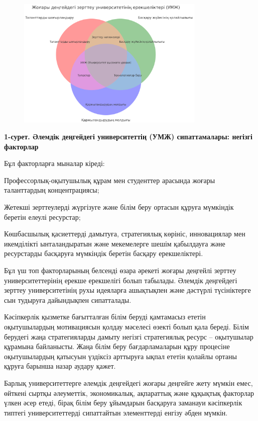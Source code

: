 \begin{figure}[H]
	\centering
	\includegraphics[width=0.8\textwidth]{media/ekon/image4}
	\caption*{}
\end{figure}


{\bfseries 1-сурет. Әлемдік деңгейдегі университеттің (УМЖ) сипаттамалары:
негізгі факторлар}

Бұл факторларға мыналар кіреді:

Профессорлық-оқытушылық құрам мен студенттер арасында жоғары
таланттардың концентрациясы;

Жетекші зерттеулерді жүргізуге және білім беру ортасын құруға мүмкіндік
беретін елеулі ресурстар;

Көшбасшылық қасиеттерді дамытуға, стратегиялық көрініс, инновациялар мен
икемділікті ынталандыратын және мекемелерге шешім қабылдауға және
ресурстарды басқаруға мүмкіндік беретін басқару ерекшеліктері.

Бұл үш топ факторларының белсенді өзара әрекеті жоғары деңгейлі зерттеу
университеттерінің ерекше ерекшелігі болып табылады. Әлемдік деңгейдегі
зерттеу университетінің рухы идеяларға ашықтықпен және дәстүрлі
түсініктерге сын тудыруға дайындықпен сипатталады.

Кәсіпкерлік қызметке бағытталған білім беруді қамтамасыз ететін
оқытушылардың мотивациясын қолдау мәселесі өзекті болып қала береді.
Білім берудегі жаңа стратегияларды дамыту негізгі стратегиялық ресурс --
оқытушылар құрамына байланысты. Жаңа білім беру бағдарламаларын құру
процесіне оқытушылардың қатысуын үздіксіз арттыруға ықпал ететін қолайлы
ортаны құруға барынша назар аудару қажет.

Барлық университеттерге әлемдік деңгейдегі жоғары деңгейге жету мүмкін
емес, өйткені сыртқы әлеуметтік, экономикалық, ақпараттық және құқықтық
факторлар үлкен әсер етеді, бірақ білім беру ұйымдарын басқаруға
заманауи кәсіпкерлік типтегі университеттерді сипаттайтын элементтерді
енгізу әбден мүмкін.

